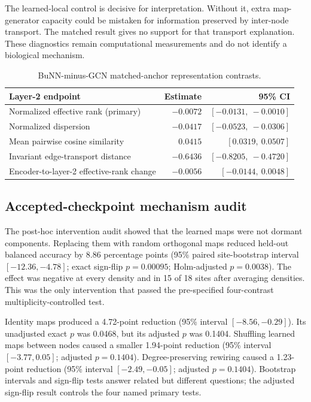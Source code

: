 \documentclass[11pt,a4paper]{article}
\begin{document}
The learned-local control is decisive for interpretation. Without it, extra
map-generator capacity could be mistaken for information preserved by
inter-node transport. The matched result gives no support for that transport
explanation. These diagnostics remain computational measurements and do not
identify a biological mechanism.

\begin{table}[htbp]
\centering
\caption{BuNN-minus-GCN matched-anchor representation contrasts.}
\label{tab:representation}
\small
\begin{tabularx}{\textwidth}{@{}Y r r@{}}
\toprule
\textbf{Layer-2 endpoint} & \textbf{Estimate} & \textbf{95\% CI} \\
\midrule
Normalized effective rank (primary) & $-0.0072$ & $[-0.0131,\ -0.0010]$ \\
Normalized dispersion & $-0.0417$ & $[-0.0523,\ -0.0306]$ \\
Mean pairwise cosine similarity & $0.0415$ & $[0.0319,\ 0.0507]$ \\
Invariant edge-transport distance & $-0.6436$ & $[-0.8205,\ -0.4720]$ \\
Encoder-to-layer-2 effective-rank change & $-0.0056$ & $[-0.0144,\ 0.0048]$ \\
\bottomrule
\end{tabularx}
\end{table}

\subsection{Accepted-checkpoint mechanism audit}

The post-hoc intervention audit showed that the learned maps were not dormant
components. Replacing them with random orthogonal maps reduced held-out
balanced accuracy by 8.86 percentage points (95\% paired site-bootstrap
interval $[-12.36,-4.78]$; exact sign-flip $p=0.00095$;
Holm-adjusted $p=0.0038$). The effect was negative at every density and in 15
of 18 sites after averaging densities. This was the only intervention that
passed the pre-specified four-contrast multiplicity-controlled test.

Identity maps produced a 4.72-point reduction (95\% interval
$[-8.56,-0.29]$). Its unadjusted exact $p$ was 0.0468, but its adjusted
$p$ was 0.1404. Shuffling learned maps between nodes caused a smaller
1.94-point reduction (95\% interval $[-3.77,0.05]$; adjusted
$p=0.1404$). Degree-preserving rewiring caused a 1.23-point reduction
(95\% interval $[-2.49,-0.05]$; adjusted $p=0.1404$). Bootstrap intervals
and sign-flip tests answer related but different questions; the adjusted
sign-flip result controls the four named primary tests.
\end{document}
